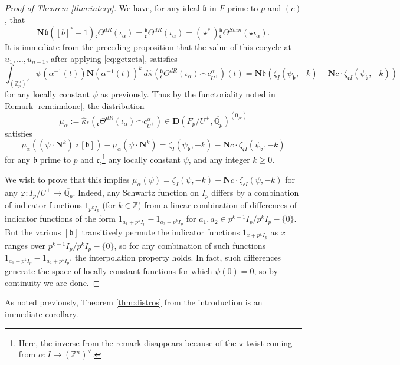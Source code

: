 \documentclass[10pt]{amsart}
\theoremstyle{definition}
\newcommand{\Z}{\mathbb{Z}}
\newcommand{\Q}{\mathbb{Q}}
\renewcommand{\c}{\mathfrak{c}}
\renewcommand{\b}{\mathfrak{b}}
\newcommand{\D}{\mathbf{D}}
\numberwithin{equation}{section}
\begin{document}
    \begin{proof}[Proof of Theorem \ref{thm:interp}]
        We have, for any ideal $\b$ in $F$ prime to $p$ and $(c)$, that
        \[
        \mathbf{N}\b([b]^*-1){}_\c\Theta^{dR}(\iota_\alpha)={}^\b_\c\Theta^{dR}(\iota_\alpha) = (\star^*){}^\b_\c\Theta^{Shin}(\star \iota_\alpha).
        \]
        It is immediate from the preceding proposition that the value of this cocycle at $u_1,\ldots, u_{n-1}$, after applying \eqref{eq:getzeta}, satisfies
        \begin{equation} \label{eq:bstabilized}
            \int_{(\Z_p^n)^\vee} \psi(\alpha^{-1}(t)) \mathbf{N}(\alpha^{-1}(t))^k \, d\widehat{\kappa}({}^\b_\c\Theta^{dR}(\iota_\alpha)\frown c_{U^+}^\alpha)(t) = \mathbf{N}\b(\zeta_{I}(\psi_\b, -k)-\mathbf{N}c\cdot \zeta_{\c I}(\psi_\b,-k))
        \end{equation}
        for any locally constant $\psi$ as previously. Thus by the functoriality noted in Remark \ref{rem:imdone}, the distribution 
        \[
        \mu_\alpha:=\widehat{\kappa}_*({}_\c\Theta^{dR}(\iota_\alpha)\frown c_{U^+}^\alpha) \in \D(F_p/U^+, \overline{\Q_p})^{(0_{/c})}
        \]
        satisfies 
        \[
        \mu_\alpha((\psi \cdot \mathbf{N}^k)\circ [\b]) - \mu_\alpha(\psi \cdot \mathbf{N}^k) =\zeta_{I}(\psi_\b, -k)-\mathbf{N}c \cdot \zeta_{\c I}(\psi_\b,-k)
        \]
        for any $\mathfrak{b}$ prime to $p$ and $\mathfrak{c}$,\footnote{Here, the inverse from the remark disappears because of the $\star$-twist coming from $\alpha: I\to (\Z^n)^\vee$.} any locally constant $\psi$, and any integer $k\ge 0$.
        
        We wish to prove that this implies $\mu_\alpha(\psi) =\zeta_I(\psi, -k) - \mathbf{N}c \cdot \zeta_{\c I}(\psi, -k)$ for any $\varphi: I_p/U^+\to \overline{\Q_p}$. Indeed, any Schwartz function on $I_p$ differs by a combination of indicator functions $1_{p^kI_p}$ (for $k\in \Z$) from a linear combination of differences of indicator functions of the form $1_{a_1+p^kI_p} - 1_{a_2+p^kI_p}$ for $a_1,a_2\in p^{k-1}I_p/p^kI_p- \{0\}$. But the various $[\b]$ transitively permute the indicator functions $1_{x+p^kI_p}$ as $x$ ranges over $p^{k-1}I_p/p^kI_p- \{0\}$, so for any combination of such functions $1_{a_1+p^kI_p} - 1_{a_2+p^kI_p}$, the interpolation property holds. In fact, such differences generate the space of locally constant functions for which $\psi(0)=0$, so by continuity we are done.
    \end{proof}

    As noted previously, Theorem \ref{thm:distros} from the introduction is an immediate corollary. 
    
\end{document}
